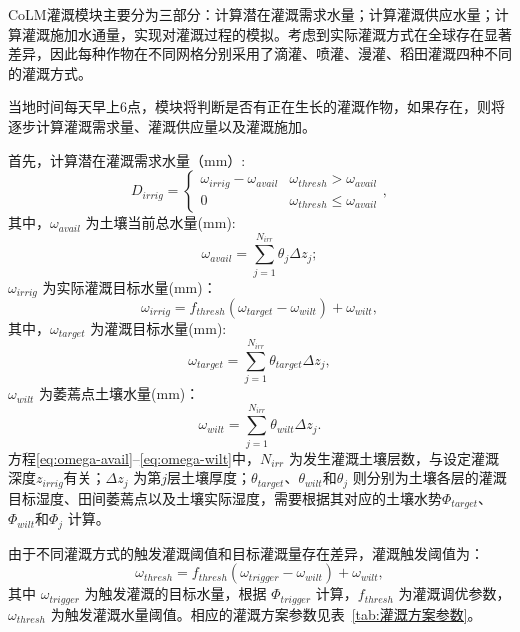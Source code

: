 CoLM灌溉模块主要分为三部分：计算潜在灌溉需求水量；计算灌溉供应水量；计算灌溉施加水通量，实现对灌溉过程的模拟。考虑到实际灌溉方式在全球存在显著差异，因此每种作物在不同网格分别采用了滴灌、喷灌、漫灌、稻田灌溉四种不同的灌溉方式。

当地时间每天早上6点，模块将判断是否有正在生长的灌溉作物，如果存在，则将逐步计算灌溉需求量、灌溉供应量以及灌溉施加。

首先，计算潜在灌溉需求水量（mm）:
\begin{equation}
    D_{irrig} = \begin{cases}
        \omega_{irrig} - \omega_{avail} & \omega_{thresh} > \omega_{avail} \\
        0     & \omega_{thresh} \leq \omega_{avail}
    \end{cases},
\end{equation}
其中，$\omega_{avail}$ 为土壤当前总水量(mm):
\begin{equation}\label{eq:omega-avail}
    \omega_{avail} = \sum_{j=1}^{N_{irr}}\theta_j\Delta z_j;
\end{equation}
$\omega_{irrig}$ 为实际灌溉目标水量(mm)：
\begin{equation}
    \omega_{irrig} = f_{thresh}(\omega_{target}-\omega_{wilt}) + \omega_{wilt}, 
\end{equation}
其中，$\omega_{target}$ 为灌溉目标水量(mm): 
\begin{equation}
    \omega_{target} = \sum_{j=1}^{N_{irr}}\theta_{target}\Delta z_j,
\end{equation}
$\omega_{wilt}$ 为萎蔫点土壤水量(mm)：
\begin{equation}\label{eq:omega-wilt}
    \omega_{wilt} = \sum_{j=1}^{N_{irr}}\theta_{wilt}\Delta z_j.
\end{equation}
方程\eqref{eq:omega-avail}--\eqref{eq:omega-wilt}中，$N_{irr}$ 为发生灌溉土壤层数，与设定灌溉深度$z_{irrig}$有关；$\Delta z_j$ 为第$j$层土壤厚度；$\theta_{target}$、$\theta_{wilt}$和$\theta_j$ 则分别为土壤各层的灌溉目标湿度、田间萎蔫点以及土壤实际湿度，需要根据其对应的土壤水势$\Phi_{target}$、 $\Phi_{wilt}$和$\Phi_j$ 计算。

由于不同灌溉方式的触发灌溉阈值和目标灌溉量存在差异，灌溉触发阈值为：
\begin{equation}
    \omega_{thresh} = f_{thresh}(\omega_{trigger}-\omega_{wilt}) + \omega_{wilt},
\end{equation}
其中 $\omega_{trigger}$ 为触发灌溉的目标水量，根据 $\Phi_{trigger}$ 计算，$f_{thresh}$ 为灌溉调优参数，$\omega_{thresh}$ 为触发灌溉水量阈值。相应的灌溉方案参数见表~\ref{tab:灌溉方案参数}。

